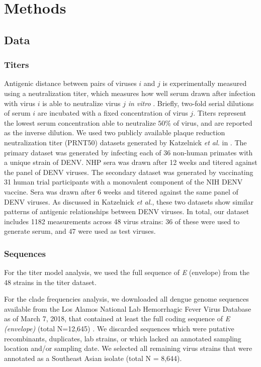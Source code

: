 \documentclass[11pt,oneside,letterpaper]{article}
\begin{document}
\newpage

\section*{Methods}
\subsection*{Data}

\subsubsection*{Titers}
Antigenic distance between pairs of viruses $i$ and $j$ is experimentally measured using a neutralization titer, which measures how well serum drawn after infection with virus $i$ is able to neutralize virus $j$ \textit{in vitro} \citep{russell1967dengue}.
Briefly, two-fold serial dilutions of serum $i$ are incubated with a fixed concentration of virus $j$.
Titers represent the lowest serum concentration able to neutralize $50\%$ of virus, and are reported as the inverse dilution.
We used two publicly available plaque reduction neutralization titer (PRNT50) datasets generated by Katzelnick \textit{et al.} in \citep{katzelnick2015dengue}.
The primary dataset was generated by infecting each of 36 non-human primates with a unique strain of DENV.
NHP sera was drawn after 12 weeks and titered against the panel of DENV viruses.
The secondary dataset was generated by vaccinating 31 human trial participants with a monovalent component of the NIH DENV vaccine.
Sera was drawn after 6 weeks and titered against the same panel of DENV viruses.
As discussed in Katzelnick \textit{et al.}, these two datasets show similar patterns of antigenic relationships between DENV viruses.
In total, our dataset includes 1182 measurements across 48 virus strains: 36 of these were used to generate serum, and 47 were used as test viruses.

\subsubsection*{Sequences}
For the titer model analysis, we used the full sequence of \textit{E} (envelope) from the 48 strains in the titer dataset.

For the clade frequencies analysis, we downloaded all dengue genome sequences available from the Los Alamos National Lab Hemorrhagic Fever Virus Database as of March 7, 2018, that contained at least the full coding sequence of \textit{E (envelope)} (total N=12,645) \citep{kuiken2011lanl}.
We discarded sequences which were putative recombinants, duplicates, lab strains, or which lacked an annotated sampling location and/or sampling date.
We selected all remaining virus strains that were annotated as a Southeast Asian isolate (total N = 8,644).
\end{document}
